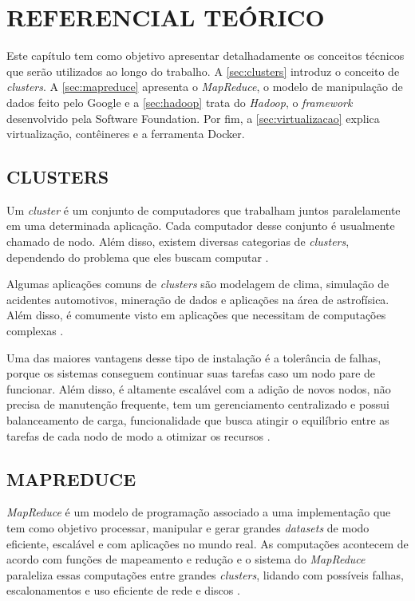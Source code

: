 \chapter{REFERENCIAL TEÓRICO} \label{cha:refteorico}

Este capítulo tem como objetivo apresentar detalhadamente os conceitos técnicos que serão utilizados ao longo do trabalho. A \autoref{sec:clusters} introduz o conceito de \textit{clusters}. A \autoref{sec:mapreduce} apresenta o \textit{MapReduce}, o modelo de manipulação de dados feito pelo Google e a \autoref{sec:hadoop} trata do \textit{Hadoop}, o \textit{\gls{framework}} desenvolvido pela  Software Foundation. Por fim, a \autoref{sec:virtualizacao} explica virtualização, contêineres e a ferramenta Docker.

\section{CLUSTERS} \label{sec:clusters}

Um \textit{cluster} é um conjunto de computadores que trabalham juntos paralelamente em uma determinada aplicação. Cada computador desse conjunto é usualmente chamado de nodo. Além disso, existem diversas categorias de \textit{clusters}, dependendo do problema que eles buscam computar \cite{GoldmanApache12}.

Algumas aplicações comuns de \textit{clusters} são modelagem de clima, simulação de acidentes automotivos, mineração de dados e aplicações na área de astrofísica. Além disso, é comumente visto em aplicações que necessitam de computações complexas \cite{Nwobodo2015}.

Uma das maiores vantagens desse tipo de instalação é a tolerância de falhas, porque os sistemas conseguem continuar suas tarefas caso um nodo pare de funcionar. Além disso, é altamente escalável com a adição de novos nodos, não precisa de manutenção frequente, tem um gerenciamento centralizado e possui balanceamento de carga, funcionalidade que busca atingir o equilíbrio entre as tarefas de cada nodo de modo a otimizar os recursos \cite{ClusterGridCloudComparison11}.

\section{MAPREDUCE} \label{sec:mapreduce}

\textit{MapReduce} é um modelo de programação associado a uma implementação que tem como objetivo processar, manipular e gerar grandes \textit{datasets} de modo eficiente, escalável e com aplicações no mundo real. As computações acontecem de acordo com funções de mapeamento e redução e o sistema do \textit{MapReduce} paraleliza essas computações entre grandes \textit{clusters}, lidando com possíveis falhas, escalonamentos e uso eficiente de rede e discos \cite{MapReduce08}.

